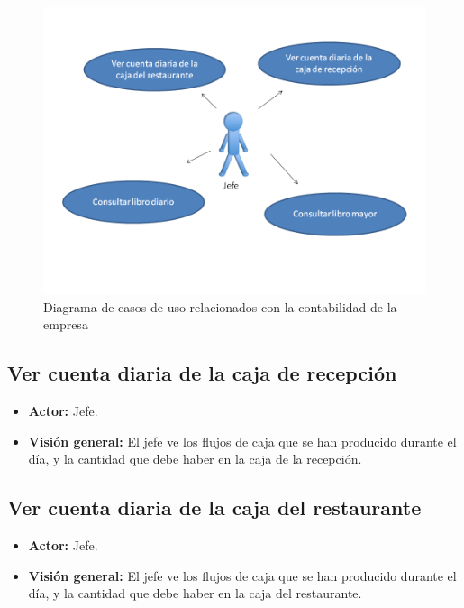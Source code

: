 \documentclass[spanish,a4paper,11pt, twoside]{report}	%
\begin{document}
	\begin{figure}[!h]
		\centering
		\includegraphics[scale=0.5]{Contabilidad.png}
		\caption{Diagrama de casos de uso relacionados con la contabilidad de la empresa}
	\end{figure}

	
	\subsection{Ver cuenta diaria de la caja de recepción}
		\begin{itemize}
			\item \textbf{Actor:} Jefe.
			\item \textbf{Visión general:} El jefe ve los flujos de caja que se han producido durante el día, 
				y la cantidad que debe haber en la caja de la recepción.	
		\end {itemize}


	\subsection{Ver cuenta diaria de la caja del restaurante}
		\begin{itemize}
			\item \textbf{Actor:} Jefe.
			\item \textbf{Visión general:} El jefe ve los flujos de caja que se han producido durante el día, 
				y la cantidad que debe haber en la caja del restaurante.	
		\end {itemize}
\end{document}
